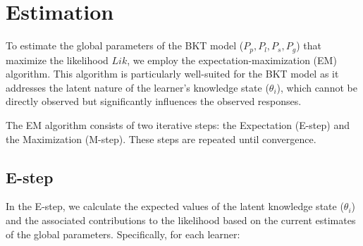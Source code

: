 \documentclass{article}
\begin{document}
\begin{center}
\end{center}
\section{Estimation}

To estimate the global parameters of the BKT model (\(P_p, P_l, P_s, P_g\)) that maximize the likelihood \(Lik\), we employ the expectation-maximization (EM) algorithm. This algorithm is particularly well-suited for the BKT model as it addresses the latent nature of the learner's knowledge state (\(\theta_i\)), which cannot be directly observed but significantly influences the observed responses.

The EM algorithm consists of two iterative steps: the Expectation (E-step) and the Maximization (M-step). These steps are repeated until convergence.

\subsection{E-step}
In the E-step, we calculate the expected values of the latent knowledge state (\(\theta_i\)) and the associated contributions to the likelihood based on the current estimates of the global parameters. Specifically, for each learner:
\end{document}

